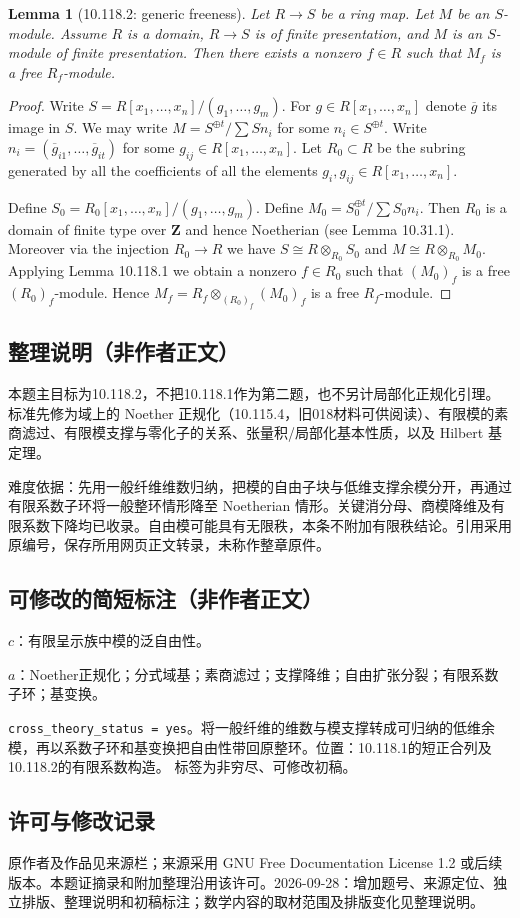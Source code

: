 \documentclass[UTF8,11pt]{ctexart}
\newtheorem*{lemma}{Lemma}
\theoremstyle{definition}
\begin{document}
\begin{lemma}[10.118.2: generic freeness]
Let $R\to S$ be a ring map. Let $M$ be an $S$-module. Assume $R$ is a domain, $R\to S$ is of finite presentation, and $M$ is an $S$-module of finite presentation. Then there exists a nonzero $f\in R$ such that $M_f$ is a free $R_f$-module.
\end{lemma}
\begin{proof}
Write $S=R[x_1,\ldots,x_n]/(g_1,\ldots,g_m)$. For $g\in R[x_1,\ldots,x_n]$ denote $\overline g$ its image in $S$. We may write $M=S^{\oplus t}/\sum Sn_i$ for some $n_i\in S^{\oplus t}$. Write $n_i=(\overline g_{i1},\ldots,\overline g_{it})$ for some $g_{ij}\in R[x_1,\ldots,x_n]$. Let $R_0\subset R$ be the subring generated by all the coefficients of all the elements $g_i,g_{ij}\in R[x_1,\ldots,x_n]$.

Define $S_0=R_0[x_1,\ldots,x_n]/(g_1,\ldots,g_m)$. Define $M_0=S_0^{\oplus t}/\sum S_0n_i$. Then $R_0$ is a domain of finite type over $\mathbf Z$ and hence Noetherian (see Lemma 10.31.1). Moreover via the injection $R_0\to R$ we have $S\cong R\otimes_{R_0}S_0$ and $M\cong R\otimes_{R_0}M_0$. Applying Lemma 10.118.1 we obtain a nonzero $f\in R_0$ such that $(M_0)_f$ is a free $(R_0)_f$-module. Hence $M_f=R_f\otimes_{(R_0)_f}(M_0)_f$ is a free $R_f$-module.
\end{proof}
\subsection*{整理说明（非作者正文）}
本题主目标为10.118.2，不把10.118.1作为第二题，也不另计局部化正规化引理。标准先修为域上的 Noether 正规化（10.115.4，旧018材料可供阅读）、有限模的素商滤过、有限模支撑与零化子的关系、张量积/局部化基本性质，以及 Hilbert 基定理。

难度依据：先用一般纤维维数归纳，把模的自由子块与低维支撑余模分开，再通过有限系数子环将一般整环情形降至 Noetherian 情形。关键消分母、商模降维及有限系数下降均已收录。自由模可能具有无限秩，本条不附加有限秩结论。引用采用原编号，保存所用网页正文转录，未称作整章原件。
\subsection*{可修改的简短标注（非作者正文）}
$c$：有限呈示族中模的泛自由性。

$a$：Noether正规化；分式域基；素商滤过；支撑降维；自由扩张分裂；有限系数子环；基变换。

\texttt{cross\_theory\_status = yes}。将一般纤维的维数与模支撑转成可归纳的低维余模，再以系数子环和基变换把自由性带回原整环。位置：10.118.1的短正合列及10.118.2的有限系数构造。
标签为非穷尽、可修改初稿。
\subsection*{许可与修改记录}
原作者及作品见来源栏；来源采用 GNU Free Documentation License 1.2 或后续版本。本题证摘录和附加整理沿用该许可。2026-09-28：增加题号、来源定位、独立排版、整理说明和初稿标注；数学内容的取材范围及排版变化见整理说明。
\end{document}

